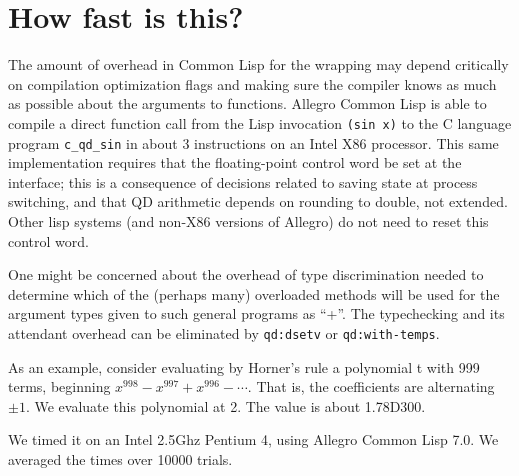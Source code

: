 \documentclass{article}
\begin{document}
\section{How fast is this?}
The amount of overhead in Common Lisp for the wrapping may depend
critically on compilation optimization flags and making sure the
compiler knows as much as possible about the arguments to
functions. Allegro Common Lisp is able to compile a direct function
call from the Lisp invocation {\tt (sin x)} to the C language program
{\verb|c_qd_sin|} in about 3 instructions on an Intel X86 processor.
This same implementation requires that the floating-point control word
be set at the interface; this is a consequence of decisions related to
saving state at process switching, and that QD arithmetic depends on
rounding to double, not extended.  Other lisp systems (and non-X86
versions of Allegro) do not need to reset this control word.

One might be concerned about the overhead of type discrimination needed
to determine which of the (perhaps many) overloaded methods will be
used for the argument types given to such general programs as
``+''.  The typechecking and its attendant
overhead can be eliminated by  {\tt qd:dsetv} or {\tt qd:with-temps}.

As an example, consider evaluating by Horner's rule a polynomial  t
with 999 terms, beginning $x^{998}-x^{997}+x^{996}- \cdots$. That is,
the coefficients are alternating $\pm 1$. We evaluate this polynomial at 2.
The value is about 1.78D300. 

We timed it on an Intel 2.5Ghz Pentium 4, using
Allegro Common Lisp 7.0. We averaged the times over 10000 trials.

\end{document}
